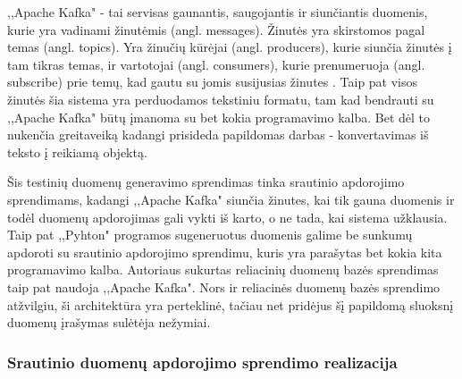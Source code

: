 \documentclass{VUMIFPSkursinis}
\begin{document}
,,Apache Kafka" - tai servisas gaunantis, saugojantis ir siunčiantis duomenis, kurie yra vadinami žinutėmis (angl. messages). Žinutės yra skirstomos pagal temas (angl. topics).
Yra žinučių kūrėjai (angl. producers), kurie siunčia žinutės į tam tikras temas, ir vartotojai (angl. consumers), kurie prenumeruoja (angl. subscribe)
prie temų, kad gautu su jomis susijusias žinutes \cite{thein2014apache}.  Taip pat visos žinutės šia sistema yra perduodamos tekstiniu formatu, 
tam kad bendrauti su ,,Apache Kafka" būtų įmanoma su bet kokia programavimo kalba. Bet dėl to nukenčia greitaveiką kadangi prisideda
papildomas darbas - konvertavimas iš teksto į reikiamą objektą.\par
Šis testinių duomenų generavimo sprendimas tinka srautinio apdorojimo sprendimams, kadangi ,,Apache Kafka" siunčia žinutes,
kai tik gauna duomenis ir todėl duomenų apdorojimas gali vykti iš karto, o ne tada, kai sistema užklausia. Taip pat ,,Pyhton" programos sugeneruotus duomenis galime
be sunkumų apdoroti su srautinio apdorojimo sprendimu, kuris yra parašytas bet kokia kita programavimo kalba. 
Autoriaus sukurtas reliacinių duomenų bazės sprendimas taip pat naudoja ,,Apache Kafka". Nors ir reliacinės duomenų bazės sprendimo atžvilgiu, ši architektūra yra perteklinė, 
tačiau net pridėjus šį papildomą sluoksnį duomenų įrašymas sulėtėja nežymiai.\par

\subsubsection{Srautinio duomenų apdorojimo sprendimo realizacija}
\end{document}
